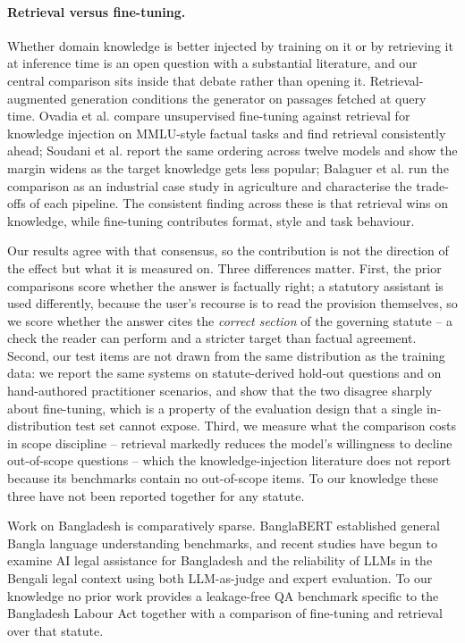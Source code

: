 \documentclass[11pt,a4paper]{article}
\begin{document}
\paragraph{Retrieval versus fine-tuning.} Whether domain knowledge is better injected by training on it or by retrieving it at inference time is an open question with a substantial literature, and our central comparison sits inside that debate rather than opening it. Retrieval-augmented generation\cite{ref_rag} conditions the generator on passages fetched at query time. Ovadia et al.\cite{ref_ragvsft} compare unsupervised fine-tuning against retrieval for knowledge injection on MMLU-style factual tasks and find retrieval consistently ahead; Soudani et al.\cite{ref_ragft_popularity} report the same ordering across twelve models and show the margin widens as the target knowledge gets less popular; Balaguer et al.\cite{ref_ragft_agri} run the comparison as an industrial case study in agriculture and characterise the trade-offs of each pipeline. The consistent finding across these is that retrieval wins on knowledge, while fine-tuning contributes format, style and task behaviour.

Our results agree with that consensus, so the contribution is not the direction of the effect but what it is measured on. Three differences matter. First, the prior comparisons score whether the answer is factually right; a statutory assistant is used differently, because the user's recourse is to read the provision themselves, so we score whether the answer cites the \emph{correct section} of the governing statute -- a check the reader can perform and a stricter target than factual agreement. Second, our test items are not drawn from the same distribution as the training data: we report the same systems on statute-derived hold-out questions and on hand-authored practitioner scenarios, and show that the two disagree sharply about fine-tuning, which is a property of the evaluation design that a single in-distribution test set cannot expose. Third, we measure what the comparison costs in scope discipline -- retrieval markedly reduces the model's willingness to decline out-of-scope questions -- which the knowledge-injection literature does not report because its benchmarks contain no out-of-scope items. To our knowledge these three have not been reported together for any statute.

Work on Bangladesh is comparatively sparse. BanglaBERT\cite{ref_banglabert} established general Bangla language understanding benchmarks, and recent studies have begun to examine AI legal assistance for Bangladesh\cite{ref_ukil} and the reliability of LLMs in the Bengali legal context using both LLM-as-judge and expert evaluation\cite{ref_bengali_reliability}. To our knowledge no prior work provides a leakage-free QA benchmark specific to the Bangladesh Labour Act together with a comparison of fine-tuning and retrieval over that statute.
\end{document}
